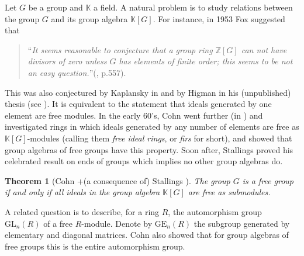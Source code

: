 \documentclass[11pt,letterpaper]{amsart}
\newtheorem{theorem}{Theorem}
\begin{document}
Let $G$ be a group and $\mathbb{K}$ a field. %
A natural problem is to study relations between the group $G$ and its group algebra $\mathbb K[G]$. For instance, in 1953 Fox suggested that%
\begin{quote}
``{\it It seems reasonable to conjecture that a group ring $\mathbb Z[G]$ can not have divisors of zero unless $G$ has elements of finite order; this seems to be not an easy question.}''(\cite{fox}, p.557).
\end{quote} 
This was also conjectured by Kaplansky in \cite{kaplansky} and by Higman in his (unpublished) thesis (see \cite{sandling}). It is equivalent to the statement that ideals generated by one element are free modules. In the early 60's, Cohn went further (in \cite{cohnfir,cohnicm,cohnbook}) and investigated rings in which ideals generated by any number of elements are free as $\mathbb K[G]$-modules (calling them {\it free ideal rings}, or {\it firs} for short), %
and showed that group algebras of free groups have this property. Soon after, Stallings proved his celebrated result on ends of groups \cite{stallings} which implies no other group algebras do.%
\begin{theorem}[Cohn \cite{cohnfir}+(a consequence of) Stallings \cite{stallings}]
\label{ffir}
The group $G$ is a free group if and only if all ideals in the group algebra $\mathbb K[G]$ are free as submodules. 
\end{theorem}
A related question is to describe, for a ring $R$, the automorphism group $\mathrm{GL}_n(R)$ of a free $R$-module. %
Denote by $\text{GE}_n(R)$ the subgroup generated by elementary and diagonal matrices. Cohn also showed that for group algebras of free groups this is the entire automorphism group.  
\end{document}
